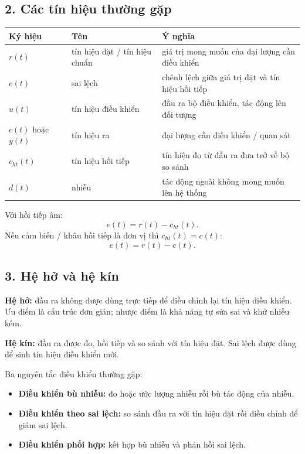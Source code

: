 \subsection*{2. Các tín hiệu thường gặp}

\begin{center}
\small
\begin{tabular}{|p{}|p{}|p{}|}
\hline
\textbf{Ký hiệu} & \textbf{Tên} & \textbf{Ý nghĩa}\\
\hline
$r(t)$ & tín hiệu đặt / tín hiệu chuẩn & giá trị mong muốn của đại lượng cần điều khiển\\
\hline
$e(t)$ & sai lệch & chênh lệch giữa giá trị đặt và tín hiệu hồi tiếp\\
\hline
$u(t)$ & tín hiệu điều khiển & đầu ra bộ điều khiển, tác động lên đối tượng\\
\hline
$c(t)$ hoặc $y(t)$ & tín hiệu ra & đại lượng cần điều khiển / quan sát\\
\hline
$c_{ht}(t)$ & tín hiệu hồi tiếp & tín hiệu đo từ đầu ra đưa trở về bộ so sánh\\
\hline
$d(t)$ & nhiễu & tác động ngoài không mong muốn lên hệ thống\\
\hline
\end{tabular}
\end{center}

Với hồi tiếp âm:
\[
\boxed{e(t)=r(t)-c_{ht}(t)}.
\]
Nếu cảm biến / khâu hồi tiếp là đơn vị thì $c_{ht}(t)=c(t)$:
\[
\boxed{e(t)=r(t)-c(t)}.
\]

\subsection*{3. Hệ hở và hệ kín}

\textbf{Hệ hở:}
đầu ra không được dùng trực tiếp để điều chỉnh lại tín hiệu điều khiển.
Ưu điểm là cấu trúc đơn giản; nhược điểm là khả năng tự sửa sai và khử nhiễu kém.

\textbf{Hệ kín:}
đầu ra được đo, hồi tiếp và so sánh với tín hiệu đặt.
Sai lệch được dùng để sinh tín hiệu điều khiển mới.

\medskip
\noindent Ba nguyên tắc điều khiển thường gặp:
\begin{itemize}[leftmargin=1.7em,itemsep=0.2em]
  \item \textbf{Điều khiển bù nhiễu:} đo hoặc ước lượng nhiễu rồi bù tác động của nhiễu.
  \item \textbf{Điều khiển theo sai lệch:} so sánh đầu ra với tín hiệu đặt rồi điều chỉnh để giảm sai lệch.
  \item \textbf{Điều khiển phối hợp:} kết hợp bù nhiễu và phản hồi sai lệch.
\end{itemize}

